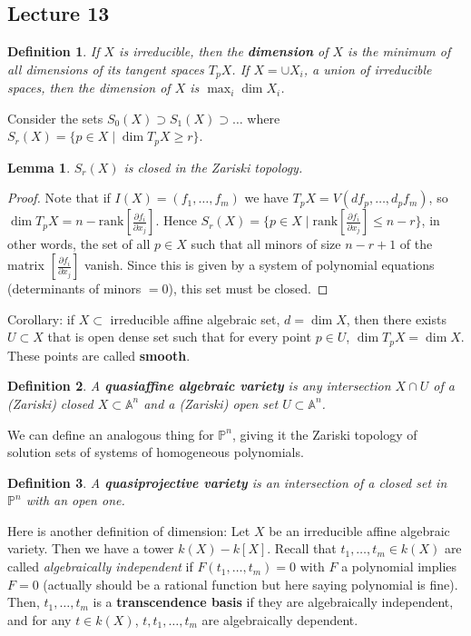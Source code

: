 \documentclass[12pt]{article}
\renewcommand{\P}{\mathbb{P}}
\newcommand{\A}{\mathbb{A}}
\newtheorem{definition}{Definition}[section]
\newtheorem{lemma}{Lemma}[section]
\begin{document}
    \subsection{Lecture 13}
    \begin{definition}
        If $X$ is irreducible, then the \textbf{dimension} of $X$ is the minimum of all dimensions of its tangent spaces $T_pX$. If $X = \cup X_i$, a union of irreducible spaces, then the dimension of $X$ is $\max_i \dim X_i$.
    \end{definition}
    Consider the sets $S_0(X) \supset S_1(X) \supset \dots$ where $S_r(X) = \{p \in X \mid \dim T_pX \geq r\}$.
    \begin{lemma}
        $S_r(X)$ is closed in the Zariski topology.
    \end{lemma}
    \begin{proof}
        Note that if $I(X) = (f_1, \dots, f_m)$ we have $T_pX = V(df_p, \dots, d_pf_m)$, so $\dim T_pX = n - \mathrm{rank}\left[\frac{\partial f_i}{\partial x_j}\right]$. Hence $S_r(X) = \{p \in X \mid \mathrm{rank}\left[\frac{\partial f_i}{\partial x_j}\right] \leq n - r\}$, in other words, the set of all $p \in X$ such that all minors of size $n-r+1$ of the matrix $\left[\frac{\partial f_i}{\partial x_j}\right]$ vanish. Since this is given by a system of polynomial equations (determinants of minors $= 0$), this set must be closed.
    \end{proof}
    Corollary: if $X \subset $ irreducible affine algebraic set, $d = \dim X$, then there exists $U \subset X$ that is open dense set such that for every point $p \in U$, $\dim T_pX = \dim X$. These points are called \textbf{smooth}.
    \begin{definition}
        A \textbf{quasiaffine algebraic variety} is any intersection $X \cap U$ of a (Zariski) closed $X \subset \A^n$ and a (Zariski) open set $U \subset \A^n$.
    \end{definition}
    We can define an analogous thing for $\P^n$, giving it the Zariski topology of solution sets of systems of homogeneous polynomials.
    \begin{definition}
        A \textbf{quasiprojective variety} is an intersection of a closed set in $\P^n$ with an open one.
    \end{definition}
    Here is another definition of dimension: Let $X$ be an irreducible affine algebraic variety. Then we have a tower $k(X) - k[X]$. Recall that $t_1, \dots, t_m \in k(X)$ are called \textit{algebraically independent} if $F(t_1, \dots, t_m) = 0$ with $F$ a polynomial implies $F = 0$ (actually should be a rational function but here saying polynomial is fine). Then, $t_1, \dots, t_m$ is a \textbf{transcendence basis} if they are algebraically independent, and for any $t \in k(X)$, $t, t_1, \dots, t_m$ are algebraically dependent. \par
\end{document}
